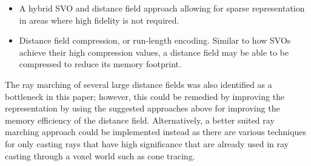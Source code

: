 \begin{itemize}
    \item A hybrid SVO and distance field approach allowing for sparse representation in areas where high fidelity is
          not required.
    \item Distance field compression, or run-length encoding. Similar to how SVOs achieve their high compression values,
          a distance field may be able to be compressed to reduce its memory footprint.
\end{itemize}

The ray marching of several large distance fields was also identified as a bottleneck in this paper; however, this could
be remedied by improving the representation by using the suggested approaches above for improving the memory efficiency
of the distance field. Alternatively, a better suited ray marching approach could be implemented instead as there are
various techniques for only casting rays that have high significance that are already used in ray casting through a
voxel world such as cone tracing.
